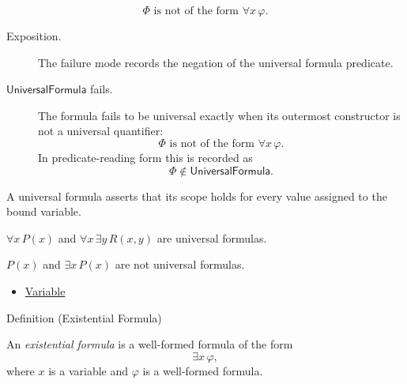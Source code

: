 \begin{remark*}
\[
  \Phi \text{ is not of the form } \forall x\,\varphi.
\]
\end{remark*}

\begin{remark*}
\begin{description}
  \item[Exposition.] The failure mode records the negation of the universal
  formula predicate.
  \item[\(\mathsf{UniversalFormula}\) fails.] The formula fails to be universal
  exactly when its outermost constructor is not a universal quantifier:
  \[
  \Phi \text{ is not of the form } \forall x\,\varphi.
  \]
  In predicate-reading form this is recorded as
  \[
  \Phi\notin\mathsf{UniversalFormula}.
  \]
\end{description}
\end{remark*}

\begin{remark*}[Interpretation]
A universal formula asserts that its scope holds for every value assigned to
the bound variable.
\end{remark*}

\begin{remark*}[Examples]
\(\forall x\,P(x)\) and \(\forall x\,\exists y\,R(x,y)\) are universal
formulas.
\end{remark*}

\begin{remark*}
\(P(x)\) and \(\exists x\,P(x)\) are not universal formulas.
\end{remark*}

\begin{dependencies}
\begin{itemize}
  \item \hyperref[def:variable]{Variable}
\end{itemize}
\end{dependencies}

\begin{definitionbox}{Definition (Existential Formula)}
\begin{definition}
\label{def:existential-q}
An \emph{existential formula} is a well-formed formula of the form
\[
\exists x\,\varphi,
\]
where \(x\) is a variable and \(\varphi\) is a well-formed formula.
\end{definition}
\end{definitionbox}

